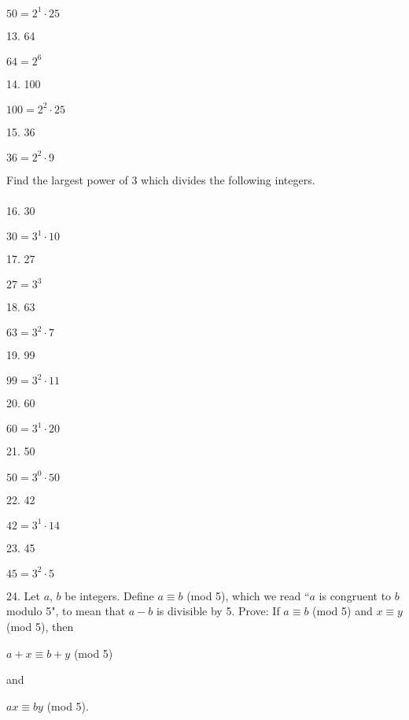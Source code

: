 \documentclass[12pt]{article}
\begin{document}
\begin{center}
$50=2^1\cdot25$
\end{center}
13. 64
\begin{center}
$64=2^6$
\end{center}
14. 100
\begin{center}
$100=2^2\cdot25$
\end{center}
15. 36
\begin{center}
$36=2^2\cdot9$
\end{center}
\noindent Find the largest power of 3 which divides the following integers. \\
\\
16. 30
\begin{center}
$30=3^1\cdot10$
\end{center}
17. 27
\begin{center}
$27=3^3$
\end{center}
18. 63
\begin{center}
$63=3^2\cdot7$
\end{center}
19. 99
\begin{center}
$99=3^2\cdot11$
\end{center}
20. 60
\begin{center}
$60=3^1\cdot20$
\end{center}
21. 50
\begin{center}
$50=3^0\cdot50$
\end{center}
22. 42
\begin{center}
$42=3^1\cdot14$
\end{center}
23. 45
\begin{center}
$45=3^2\cdot5$
\end{center}
24. Let $a$, $b$ be integers. Define $a\equiv b$ (mod 5), which we read ``$a$ is congruent to $b$ modulo 5", to mean that $a-b$ is divisible by 5. Prove: If $a\equiv b$ (mod 5) and $x\equiv y$ (mod 5), then
\begin{center}
$a+x\equiv b+y$ (mod 5)
\end{center}
and
\begin{center}
$ax\equiv by$ (mod 5).
\end{center}
\end{document}
